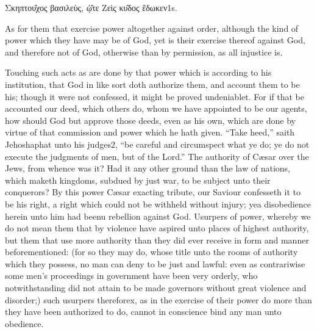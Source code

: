 Σκηπτου̑χος βασιλεὺς, ᾠ̑τε Ζεὶς κυ̑δος ἔδωκεν1s.

As for them that exercise power altogether against order, although the kind of power which they have may be of God, yet is their exercise thereof against God, and therefore not of God, otherwise than by permission, as all injustice is.

Touching such acts as are done by that power which is according to his institution, that God in like sort doth authorize them, and account them to be his; though it were not confessed, it might be proved undeniablet. For if that be accounted our deed, which others do, whom we have appointed to be our agents, how should God but approve those deeds, even as his own, which are done by virtue of that commission and power which he hath given. “Take heed,” saith Jehoshaphat unto his judges2, “be careful and circumspect what ye do; ye do not execute the judgments of men, but of the Lord.” The authority of Cæsar over the Jews, from whence was it? Had it any other ground than the law of nations, which maketh kingdoms, subdued by just war, to be subject unto their conquerors? By this power Cæsar exacting tribute, our Saviour confesseth it to be his right, a right which could not be withheld without injury; yea disobedience herein unto him had beenu rebellion against God. Usurpers of power, whereby we do not mean them that by violence have aspired unto places of highest authority, but them that use more authority than they did ever receive in form and manner beforementioned: (for so they may do, whose title unto the rooms of authority which they possess, no man can deny to be just and lawful: even as contrariwise some men’s proceedings in government have been very orderly, who notwithstanding did not attain to be made governors without great violence and disorder;) such usurpers thereforex, as in the exercise of their power do more than they have been authorized to do, cannot in conscience bind any man unto obedience.

